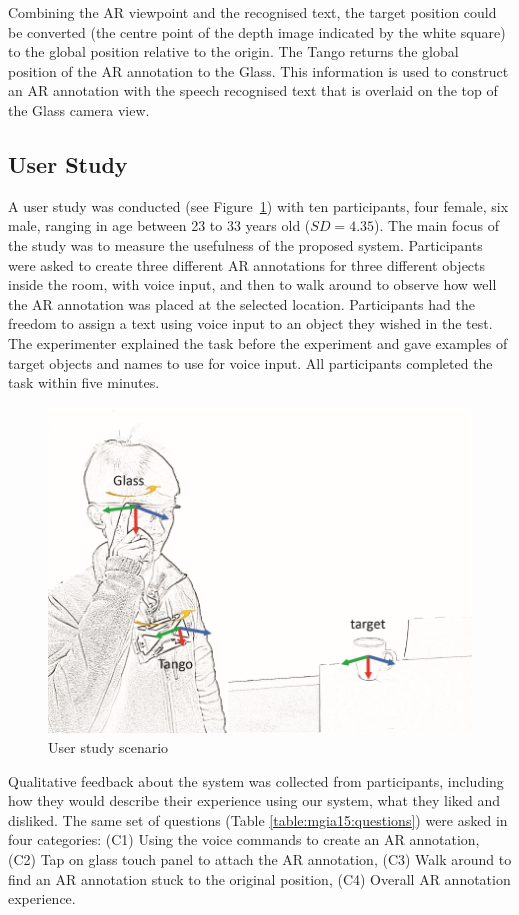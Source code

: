 Combining the AR viewpoint and the recognised text, the target position could be converted (the centre point of the depth image indicated by the white square) to the global position relative to the origin. The Tango returns the global position of the AR annotation to the Glass. This information is used to construct an AR annotation with the speech recognised text that is overlaid on the top of the Glass camera view.

\subsection{User Study}

A user study was conducted (see Figure~\ref{fig:mgia15:scenario}) with ten participants, four female, six male, ranging in age between 23 to 33 years old ($SD= 4.35$). The main focus of the study was to measure the usefulness of the proposed system. Participants were asked to create three different AR annotations for three different objects inside the room, with voice input, and then to walk around to observe how well the AR annotation was placed at the selected location. Participants had the freedom to assign a text using voice input to an object they wished in the test. The experimenter explained the task before the experiment and gave examples of target objects and names to use for voice input. All participants completed the task within five minutes. 

\begin{figure}
  \centering
  \includegraphics[width=0.6\linewidth]{images/62-3d-mgia15/axis_lo_small.jpg}
  \caption{User study scenario}
  \label{fig:mgia15:scenario}
\end{figure}

Qualitative feedback about the system was collected from participants, including how they would describe their experience using our system, what they liked and disliked. The same set of questions (Table \ref{table:mgia15:questions}) were asked in four categories: (C1) Using the voice commands to create an AR annotation, (C2) Tap on glass touch panel to attach the AR annotation, (C3)  Walk around to find an AR annotation stuck to the original position, (C4) Overall AR annotation experience.

